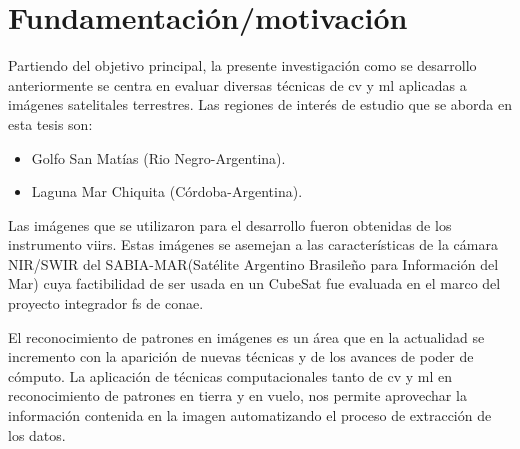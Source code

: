 \section{Fundamentación/motivación}\label{sec:fundamentacion}

Partiendo del objetivo principal, la presente investigación como se desarrollo anteriormente se centra en evaluar diversas técnicas de \ac{cv} y \ac{ml} aplicadas a imágenes satelitales terrestres. Las regiones de interés de estudio que se aborda en esta tesis son:
\begin{itemize}
	\item Golfo San Matías (Rio Negro-Argentina).
	\item Laguna Mar Chiquita (Córdoba-Argentina).
\end{itemize}

Las imágenes que se utilizaron para el desarrollo fueron obtenidas de los instrumento  \ac{viirs}. Estas imágenes se asemejan a las características de la cámara NIR/SWIR del SABIA-MAR(Satélite Argentino Brasileño para Información del Mar) cuya factibilidad de ser usada en un CubeSat fue evaluada en el marco del proyecto integrador \ac{fs} de \ac{conae}.

El reconocimiento de patrones en imágenes es un área que en la actualidad se incremento con la aparición de nuevas técnicas y de los avances de poder de cómputo. La aplicación de técnicas computacionales tanto de  \ac{cv} y \ac{ml} en reconocimiento de patrones  en tierra y en vuelo, nos permite aprovechar la información contenida en la imagen  automatizando el proceso de extracción de los datos.

